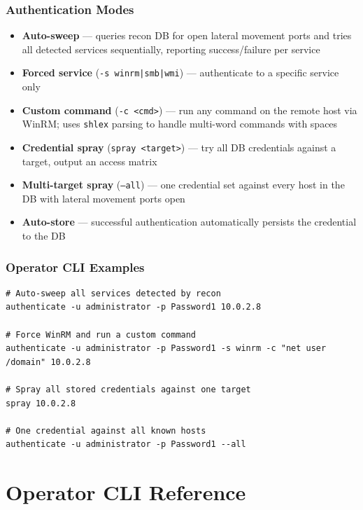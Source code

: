 \documentclass[11pt,a4paper]{article}
\begin{document}
\subsubsection{Authentication Modes}

\begin{itemize}[leftmargin=16pt, itemsep=3pt]
    \item \textbf{Auto-sweep} --- queries recon DB for open lateral movement ports and tries all detected services sequentially, reporting success/failure per service
    \item \textbf{Forced service} (\texttt{-s winrm|smb|wmi}) --- authenticate to a specific service only
    \item \textbf{Custom command} (\texttt{-c <cmd>}) --- run any command on the remote host via WinRM; uses \texttt{shlex} parsing to handle multi-word commands with spaces
    \item \textbf{Credential spray} (\texttt{spray <target>}) --- try all DB credentials against a target, output an access matrix
    \item \textbf{Multi-target spray} (\texttt{--all}) --- one credential set against every host in the DB with lateral movement ports open
    \item \textbf{Auto-store} --- successful authentication automatically persists the credential to the DB
\end{itemize}

\subsubsection{Operator CLI Examples}

\begin{lstlisting}
# Auto-sweep all services detected by recon
authenticate -u administrator -p Password1 10.0.2.8

# Force WinRM and run a custom command
authenticate -u administrator -p Password1 -s winrm -c "net user /domain" 10.0.2.8

# Spray all stored credentials against one target
spray 10.0.2.8

# One credential against all known hosts
authenticate -u administrator -p Password1 --all
\end{lstlisting}

\section{Operator CLI Reference}
\end{document}
